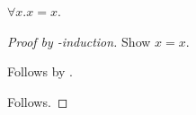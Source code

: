 \begin{proposition}\label{phase5_formula_quantified_set_induction}
    $\forall x. x = x$.
\end{proposition}
\begin{proof}[Proof by \in-induction]
    Show $x = x$.
    \begin{subproof}
        Follows by \auto.
    \end{subproof}
    Follows.
\end{proof}
